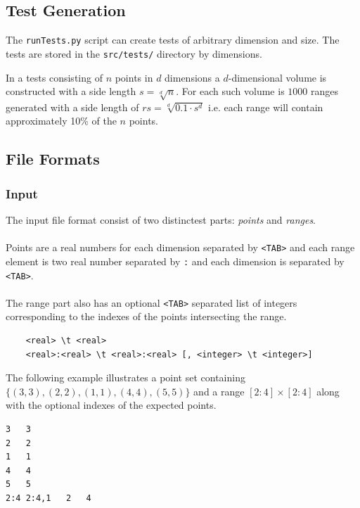 \documentclass{article}
\begin{document}
    \subsection{Test Generation}
    The \verb|runTests.py| script can create tests of arbitrary dimension and 
    size. The tests are stored in the \verb|src/tests/| directory by dimensions.
    
    In a tests consisting of $n$ points in $d$ dimensions a $d$-dimensional 
    volume is constructed with a side length $s = \sqrt[d]{n}$. For each such 
    volume is $1000$ ranges generated with a side length of 
    $rs = \sqrt[d]{0.1 \cdot s^d}$ i.e. each range will contain approximately 
    10\% of the $n$ points. 
  
  
  \subsection{File Formats}
  \subsubsection{Input}
  The input file format consist of two distinctest parts: \textit{points} and 
  \textit{ranges}. 
  \\
  \\
  Points are a real numbers for each dimension separated by \verb|<TAB>| and 
  each range element is two real number separated by \verb|:| and each dimension
  is separated by \verb|<TAB>|.
  \\
  \\
  The range part also has an optional \verb|<TAB>| separated list of integers 
  corresponding to the indexes of the points intersecting the range.  
  \begin{verbatim}
  	<real> \t <real>
  	<real>:<real> \t <real>:<real> [, <integer> \t <integer>]
  \end{verbatim}
  The following example illustrates a point set containing 
  $\{(3,3),(2,2),(1,1),(4,4),(5,5)\}$ and a range $[2:4]\times[2:4]$ along with 
  the optional indexes of the expected points.  
\begin{lstlisting}
3	3
2	2
1	1
4	4
5	5
2:4	2:4,1	2	4
\end{lstlisting}
\newpage
\end{document}
